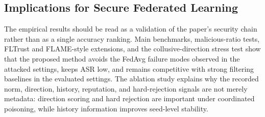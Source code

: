 \documentclass[preprint,12pt]{elsarticle}
\begin{document}
\begin{table}[t]
\centering
\caption{Event-driven validator-finality simulation. The network column reports bandwidth/RTT; rates are percentages over 500 trials. Higher valid finalization and invalid rejection are better; lower invalid acceptance and timeout are better.}
\label{tab:network-events}
\end{table}

\subsection{Implications for Secure Federated Learning}

The empirical results should be read as a validation of the paper's security chain rather than as a single accuracy ranking. Main benchmarks, malicious-ratio tests, FLTrust and FLAME-style extensions, and the collusive-direction stress test show that the proposed method avoids the FedAvg failure modes observed in the attacked settings, keeps ASR low, and remains competitive with strong filtering baselines in the evaluated settings. The ablation study explains why the recorded norm, direction, history, reputation, and hard-rejection signals are not merely metadata: direction scoring and hard rejection are important under coordinated poisoning, while history information improves seed-level stability.
\end{document}
